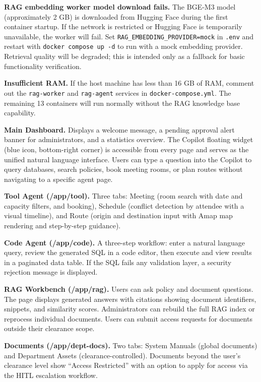 \textbf{RAG embedding worker model download fails.} The BGE-M3 model (approximately 2 GB) is downloaded from Hugging Face during the first container startup. If the network is restricted or Hugging Face is temporarily unavailable, the worker will fail. Set \texttt{RAG\_EMBEDDING\_PROVIDER=mock} in \texttt{.env} and restart with \texttt{docker compose up -d} to run with a mock embedding provider. Retrieval quality will be degraded; this is intended only as a fallback for basic functionality verification.

\textbf{Insufficient RAM.} If the host machine has less than 16 GB of RAM, comment out the \texttt{rag-worker} and \texttt{rag-agent} services in \texttt{docker-compose.yml}. The remaining 13 containers will run normally without the RAG knowledge base capability.


\textbf{Main Dashboard.} Displays a welcome message, a pending approval alert banner for administrators, and a statistics overview. The Copilot floating widget (blue icon, bottom-right corner) is accessible from every page and serves as the unified natural language interface. Users can type a question into the Copilot to query databases, search policies, book meeting rooms, or plan routes without navigating to a specific agent page.

\textbf{Tool Agent (/app/tool).} Three tabs: Meeting (room search with date and capacity filters, and booking), Schedule (conflict detection by attendee with a visual timeline), and Route (origin and destination input with Amap map rendering and step-by-step guidance).

\textbf{Code Agent (/app/code).} A three-step workflow: enter a natural language query, review the generated SQL in a code editor, then execute and view results in a paginated data table. If the SQL fails any validation layer, a security rejection message is displayed.

\textbf{RAG Workbench (/app/rag).} Users can ask policy and document questions. The page displays generated answers with citations showing document identifiers, snippets, and similarity scores. Administrators can rebuild the full RAG index or reprocess individual documents. Users can submit access requests for documents outside their clearance scope.

\textbf{Documents (/app/dept-docs).} Two tabs: System Manuals (global documents) and Department Assets (clearance-controlled). Documents beyond the user's clearance level show ``Access Restricted'' with an option to apply for access via the HITL escalation workflow.

